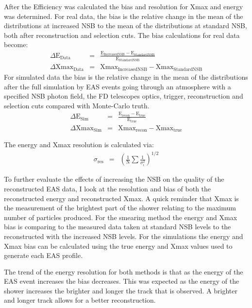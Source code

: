 After the Efficiency was calculated the bias and resolution for Xmax and energy was determined. For real data, the bias is the relative change in the mean of the distributions at increased NSB to the mean of the distributions at standard NSB, both after reconstruction and selection cuts. The bias calculations for real data become:
\begin{eqnarray}
\Delta \mathrm{E}_{\mathrm{Data}} &=& \frac{\mathrm{E}_{\mathrm{IncreasedNSB}} - \mathrm{E}_{\mathrm{StandardNSB}}}{\mathrm{E}_{\mathrm{StandardNSB}}} \label{eq:energybias_data} \\
\Delta \mathrm{Xmax}_{\mathrm{Data}} &=& \mathrm{Xmax}_{\mathrm{IncreasedNSB}} - \mathrm{Xmax}_{\mathrm{StandardNSB}}\label{eq:xmaxbias_data}
\end{eqnarray} 
For simulated data the bias is the relative change in the mean of the distributions after the full simulation by EAS events going through an atmosphere with a specified NSB photon field, the FD telescopes optics, trigger, reconstruction and selection cuts compared with Monte-Carlo truth.
\begin{eqnarray}
\Delta \mathrm{E}_{\mathrm{Sim}} &=& \frac{\mathrm{E}_{\mathrm{recon}} - \mathrm{E}_{\mathrm{true}}}{\mathrm{E}_{\mathrm{true}}}  \label{eq:energybias_sim} \\
\Delta \mathrm{Xmax}_{\mathrm{Sim}} &=& \mathrm{Xmax}_{\mathrm{recon}} - \mathrm{Xmax}_{\mathrm{true}} \label{eq:xmaxbias_sim}
\end{eqnarray}
 
 
The energy and Xmax resolution is calculated via:
\begin{eqnarray}
\sigma_{\mathrm{res}} &=& \left( \frac{1}{\mathrm{N}} \sum \frac{1}{\sigma^2_i} \right)^{1/2}
\end{eqnarray}

To further evaluate the effects of increasing the NSB on the quality of the reconstructed EAS data, I look at the resolution and bias of both the reconstructed energy and reconstructed Xmax. A quick reminder that Xmax is the measurement of the brightest part of the shower relating to the maximum number of particles produced. For the smearing method the energy and Xmax bias is comparing to the measured data taken at standard NSB levels to the reconstructed with the increased NSB levels. For the simulations the energy and Xmax bias can be calculated using the true energy and Xmax values used to generate each EAS profile.

The trend of the energy resolution for both methods is that as the energy of the EAS event increases the bias decreases. This was expected as the energy of the shower increases the brighter and longer the track that is observed. A brighter and longer track allows for a better reconstruction.

